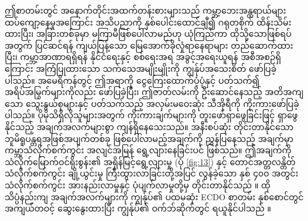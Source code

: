 \documentclass[10pt,twocolumn,letterpaper]{article}
\begin{document}
ဤစာတမ်းတွင် အနောက်တိုင်းအထက်တန်းစားများသည် ကမ္ဘာ့ဘေးအန္တရာယ်များ ထပ်ကျော့နေမှုအကြောင်း အသိပညာကို နှစ်ပေါင်းထောင်ချီ၍ ဂရုတစိုက် ထိန်းသိမ်းထားပြီး၊ အခြားတစ်ခုမှာ မကြာမီဖြစ်ပေါ်လာမည်ဟု ယုံကြည်ကာ ထိုသို့သောဖြစ်ရပ်အတွက် ပြင်ဆင်ရန် ကျယ်ပြန့်သော မြေအောက်ခိုလှုံရာနေရာများ တည်ဆောက်ထားပြီး၊ ကမ္ဘာ့အာဏာရရှိရန် နိုင်ငံရေးနှင့် စစ်ရေးအရ အခွင့်အရေးယူရန် အစီအစဉ်ရှိကြောင်း အကြံပြုထားသော သက်သေအမျိုးမျိုးကို ကျွန်ုပ်အသေးစိတ် ဖော်ပြခဲ့ပါသည်။ အမေရိကန်တွင် ဤအရာကို ငွေကြေးထောက်ပံ့ပုံနှင့် ပတ်သက်၍ အရိပ်အမြွက်များကိုလည်း ဖော်ပြခဲ့ပြီး၊ ဤဇာတ်လမ်းကို ဦးဆောင်နေသည့် အတိအကျသော သွေးနွယ်စုများနှင့် ပတ်သက်သည့် အလှမ်းမဝေးဆုံး သီအိုရီကို ကိုးကားဖော်ပြခဲ့ပါသည်။ ပိုမိုသိရှိလိုသူများအတွက် ကိုးကားချက်များကို တူးဖော်ရှာဖွေခြင်းဖြင့် ရှာဖွေနိုင်သည့် အချက်အလက်များစွာ ကျန်ရှိနေသေးသည်။
အနီးစပ်ဆုံး တိုင်းတာနိုင်သော ဘူမိရူပန္တရအဖြစ်အပျက်တစ်ခု ဖြစ်ပေါ်လာမည့်အချက်ကို ညွှန်ပြနေသည့် အချက်မှာ ကမ္ဘာ့သံလိုက်စက်ကွင်း အလျင်အမြန် ရွေ့လျားနေခြင်းပင် ဖြစ်သည်။ ဤအချက်ကို သံလိုက်မြောက်ဝင်ရိုးစွန်း၏ အရှိန်မြင့်ရွေ့လျားမှု (ပုံ \ref{fig:13}) နှင့် တောင်အတ္တလန္တိတ် သံလိုက်စက်ကွင်း ချို့ယွင်းမှု ကြီးထွားလာခြင်းတို့အပြင် လွန်ခဲ့သော နှစ် ၄၀၀ အတွင်း သံလိုက်စက်ကွင်း အားနည်းလာမှုနှင့် ပုံပျက်လာမှုတို့မှ တိုင်းတာနိုင်သည် \cite{3}။ ထိုသိပ္ပံနည်းကျ အချက်အလက်များကို ကျွန်ုပ်၏ ပထမဆုံး ECDO စာတမ်း နှစ်စောင်တွင် အကျယ်တဝင့် ဆွေးနွေးထားပြီး ကျွန်ုပ်၏ ဝက်ဘ်ဆိုက်တွင် ရယူနိုင်ပါသည် \cite{3}။
\end{document}
